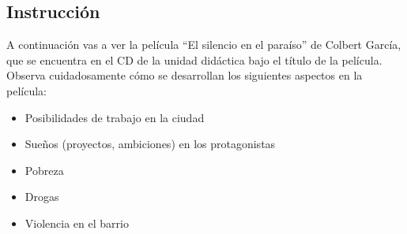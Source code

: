 \documentclass[11pt,fleqn,twocolumn]{book} %
\begin{document}
\vspace{1em}
\subsection*{Instrucción}
A continuación vas a ver la película “El silencio en el paraíso” de Colbert García, que se encuentra en el CD de la unidad didáctica bajo el título de la película. Observa cuidadosamente cómo se desarrollan los siguientes aspectos en la película:\\
\begin{itemize}
\item Posibilidades de trabajo en la ciudad
\item Sueños (proyectos, ambiciones) en los protagonistas
\item Pobreza
\item Drogas
\item Violencia en el barrio
\end{itemize}

\vspace{2em}
\end{document}
